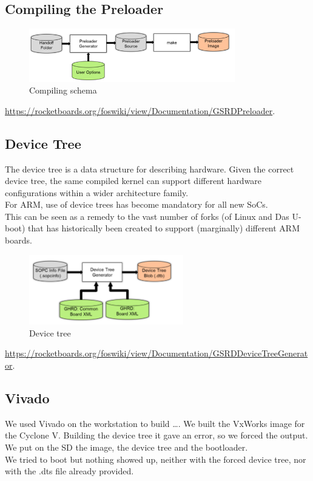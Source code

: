 \subsection{Compiling the Preloader}
\begin{figure}[h]
	\centering		\includegraphics[width=0.8\textwidth]{img/schema}
	\caption{Compiling schema}
    	\label{fig:schema}
\end{figure}

\url{https://rocketboards.org/foswiki/view/Documentation/GSRDPreloader}.

\subsection{Device Tree}
The device tree is a data structure for describing hardware. 
Given the correct device tree, the same compiled kernel can support different hardware configurations within a wider architecture family.\\
For ARM, use of device trees has become mandatory for all new SoCs.\\
This can be seen as a remedy to the vast number of forks (of Linux and Das U-boot) that has historically been created to support (marginally) different ARM boards.\\

\begin{figure}[h]
	\centering		\includegraphics[width=0.6\textwidth]{img/devicetree}
	\caption{Device tree}
    	\label{fig:devicetree}
\end{figure}

\url{https://rocketboards.org/foswiki/view/Documentation/GSRDDeviceTreeGenerator}.

\subsection{Vivado}
We used Vivado on the workstation to build ….
We built the VxWorks image for the Cyclone V.
Building the device tree it gave an error, so we forced the output.\\ 
We put on the SD the image, the device tree and the bootloader.\\
We tried to boot but nothing showed up, neither with the forced device tree, nor with the .dts file already provided.\\

